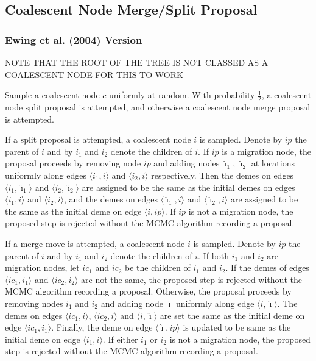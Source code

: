 \documentclass[12pt,a4paper]{article}
\newcommand{\ihat}{\hat{\imath}}
\begin{document}
		\subsection{Coalescent Node Merge/Split Proposal}
			\subsubsection{Ewing et al. (2004) Version}
				NOTE THAT THE ROOT OF THE TREE IS NOT CLASSED AS A COALESCENT NODE FOR THIS TO WORK
			
				Sample a coalescent  node $c$ uniformly at random. With probability $\frac{1}{2}$, a coalescent node split proposal is attempted, and otherwise a coalescent node merge proposal is attempted.
				
				If a split proposal is attempted, a coalescent node $i$ is sampled. Denote by $ip$ the parent of $i$ and by $i_1$ and $i_2$ denote the children of $i$. If $ip$ is a migration node, the proposal proceeds by removing node $ip$ and adding nodes $\ihat_1$, $\ihat_2$ at locations uniformly along edges $\langle i_1, i \rangle$ and $\langle i_2, i \rangle$ respectively. Then the demes on edges $\langle i_1, \ihat_1 \rangle$ and $\langle i_2, \ihat_2 \rangle$ are assigned to be the same as the initial demes on edges $\langle i_1, i \rangle$ and $\langle i_2, i \rangle$, and the demes on edges $\langle \ihat_1, i \rangle$ and $\langle \ihat_2, i \rangle$ are assigned to be the same as the initial deme on edge $\langle i, ip \rangle$. If $ip$ is not a migration node, the proposed step is rejected without the MCMC algorithm recording a proposal.
				
				If a merge move is attempted, a coalescent node $i$ is sampled. Denote by $ip$ the parent of $i$ and by $i_1$ and $i_2$ denote the children of $i$. If both $i_1$ and $i_2$ are migration nodes, let $ic_1$ and $ic_2$ be the children of $i_1$ and $i_2$. If the demes of edges $\langle ic_1, i_1 \rangle$ and $\langle ic_2, i_2 \rangle$ are not the same, the proposed step is rejected without the MCMC algorithm recording a proposal. Otherwise, the proposal proceeds by removing nodes $i_1$ and $i_2$ and adding node $\ihat$ uniformly along edge $\langle i, \ihat \rangle$. The demes on edges $\langle ic_1, i \rangle$, $\langle ic_2, i \rangle$ and $\langle i, \ihat \rangle$ are set the same as the initial deme on edge $\langle ic_1, i_1 \rangle$. Finally, the deme on edge $\langle \ihat, ip \rangle$ is updated to be same as the initial deme on edge $\langle i_1, i \rangle$. If either $i_1$ or $i_2$ is not a migration node, the proposed step is rejected without the MCMC algorithm recording a proposal.
				
\end{document}
